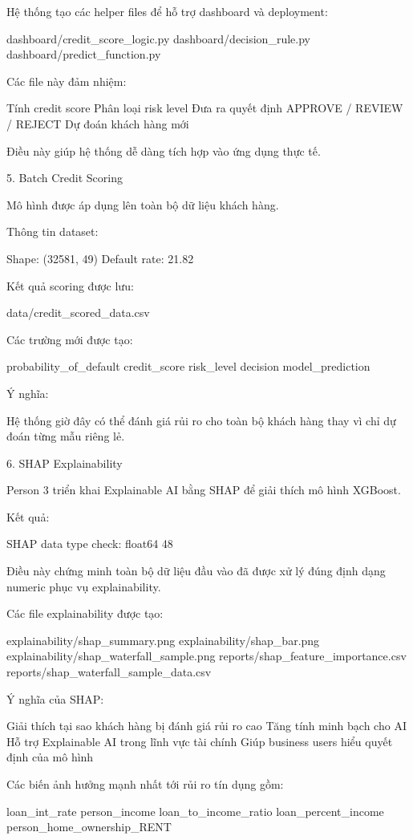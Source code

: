 Hệ thống tạo các helper files để hỗ trợ dashboard và deployment:

dashboard/credit_score_logic.py
dashboard/decision_rule.py
dashboard/predict_function.py

Các file này đảm nhiệm:

Tính credit score
Phân loại risk level
Đưa ra quyết định APPROVE / REVIEW / REJECT
Dự đoán khách hàng mới

Điều này giúp hệ thống dễ dàng tích hợp vào ứng dụng thực tế.

5. Batch Credit Scoring

Mô hình được áp dụng lên toàn bộ dữ liệu khách hàng.

Thông tin dataset:

Shape: (32581, 49)
Default rate: 21.82%

Kết quả scoring được lưu:

data/credit_scored_data.csv

Các trường mới được tạo:

probability_of_default
credit_score
risk_level
decision
model_prediction

Ý nghĩa:

Hệ thống giờ đây có thể đánh giá rủi ro cho toàn bộ khách hàng thay vì chỉ dự đoán từng mẫu riêng lẻ.

6. SHAP Explainability

Person 3 triển khai Explainable AI bằng SHAP để giải thích mô hình XGBoost.

Kết quả:

SHAP data type check:
float64    48

Điều này chứng minh toàn bộ dữ liệu đầu vào đã được xử lý đúng định dạng numeric phục vụ explainability.

Các file explainability được tạo:

explainability/shap_summary.png
explainability/shap_bar.png
explainability/shap_waterfall_sample.png
reports/shap_feature_importance.csv
reports/shap_waterfall_sample_data.csv

Ý nghĩa của SHAP:

Giải thích tại sao khách hàng bị đánh giá rủi ro cao
Tăng tính minh bạch cho AI
Hỗ trợ Explainable AI trong lĩnh vực tài chính
Giúp business users hiểu quyết định của mô hình

Các biến ảnh hưởng mạnh nhất tới rủi ro tín dụng gồm:

loan_int_rate
person_income
loan_to_income_ratio
loan_percent_income
person_home_ownership_RENT

